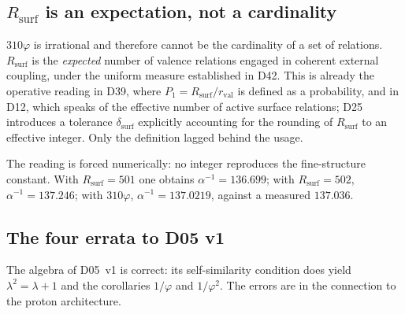 \documentclass[11pt,a4paper]{article}
\theoremstyle{plain}
\theoremstyle{definition}
\theoremstyle{remark}
\newcommand{\rval}{r_{\mathrm{val}}}
\newcommand{\Rsurf}{R_{\mathrm{surf}}}
\begin{document}
\subsection{\texorpdfstring{$\Rsurf$}{Rsurf} is an expectation, not a cardinality}
\label{subsec:Rsurfexpectation}
$310\varphi$ is irrational and therefore cannot be the cardinality of a set of relations. $\Rsurf$ is the \emph{expected} number of valence relations engaged in coherent external coupling, under the uniform measure established in D42. This is already the operative reading in D39, where $P_1=\Rsurf/\rval$ is defined as a probability, and in D12, which speaks of the effective number of active surface relations; D25 introduces a tolerance $\delta_{\mathrm{surf}}$ explicitly accounting for the rounding of $\Rsurf$ to an effective integer. Only the definition lagged behind the usage.

The reading is forced numerically: no integer reproduces the fine-structure constant. With $\Rsurf=501$ one obtains $\alpha^{-1}=136.699$; with $\Rsurf=502$, $\alpha^{-1}=137.246$; with $310\varphi$, $\alpha^{-1}=137.0219$, against a measured $137.036$.

\subsection{The four errata to D05 v1}
\label{subsec:D05errata}
The algebra of D05~v1 is correct: its self-similarity condition does yield $\lambda^2=\lambda+1$ and the corollaries $1/\varphi$ and $1/\varphi^2$. The errors are in the connection to the proton architecture.
\end{document}
